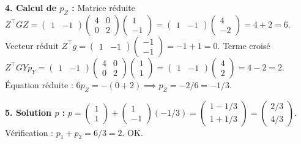 \begin{correction}
\textbf{4. Calcul de $p_Z$ :}
Matrice réduite $Z^\top G Z = \begin{pmatrix} 1 & -1 \end{pmatrix} \begin{pmatrix} 4 & 0 \\ 0 & 2 \end{pmatrix} \begin{pmatrix} 1 \\ -1 \end{pmatrix} = \begin{pmatrix} 1 & -1 \end{pmatrix} \begin{pmatrix} 4 \\ -2 \end{pmatrix} = 4 + 2 = 6$.
Vecteur réduit $Z^\top g = \begin{pmatrix} 1 & -1 \end{pmatrix} \begin{pmatrix} -1 \\ -1 \end{pmatrix} = -1 + 1 = 0$.
Terme croisé $Z^\top G Y p_Y = \begin{pmatrix} 1 & -1 \end{pmatrix} \begin{pmatrix} 4 & 0 \\ 0 & 2 \end{pmatrix} \begin{pmatrix} 1 \\ 1 \end{pmatrix} = \begin{pmatrix} 1 & -1 \end{pmatrix} \begin{pmatrix} 4 \\ 2 \end{pmatrix} = 4 - 2 = 2$.
Équation réduite : $6 p_Z = -(0 + 2) \implies p_Z = -2/6 = -1/3$.

\textbf{5. Solution $p$ :}
$p = \begin{pmatrix} 1 \\ 1 \end{pmatrix} + \begin{pmatrix} 1 \\ -1 \end{pmatrix} (-1/3) = \begin{pmatrix} 1 - 1/3 \\ 1 + 1/3 \end{pmatrix} = \begin{pmatrix} 2/3 \\ 4/3 \end{pmatrix}$.
Vérification : $p_1 + p_2 = 6/3 = 2$. OK.
\end{correction}
\bigskip

